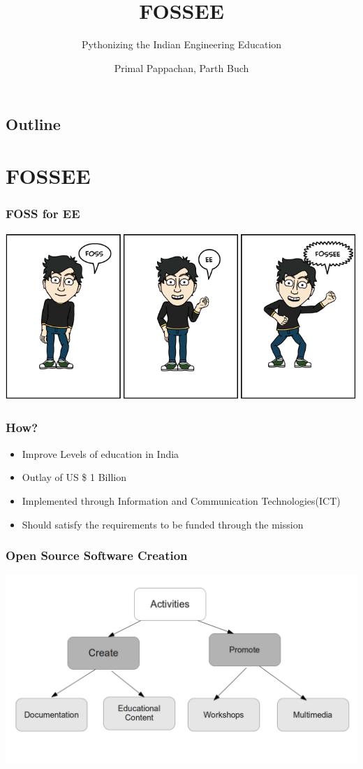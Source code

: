 \documentclass[compress,red]{beamer} %
\title{FOSSEE}
\subtitle{Pythonizing the Indian Engineering Education}
\author[]{Primal Pappachan, Parth Buch}  %
\institute{IIT Bombay}
\date[]{} %
\begin{document}
\begin{frame}
	 \titlepage
\end{frame}

\begin{frame}
\section*{Outline}
\tableofcontents
\end{frame}

\section{FOSSEE}
\begin{frame}
\frametitle{FOSS for EE}
\includegraphics[scale=0.30]{foss_ee.png}
\end{frame}

\begin{frame}
\frametitle{How?}
\begin{itemize}
\item Improve Levels of education in India
\item Outlay of US \$ 1 Billion
\item Implemented through Information and Communication Technologies(ICT)
\item Should satisfy the requirements to be funded through the mission
\end{itemize}
\end{frame}


\begin{frame}
\frametitle{Open Source Software Creation}
\includegraphics[scale=.30]{tree.png}
\end{frame}
\end{document}
